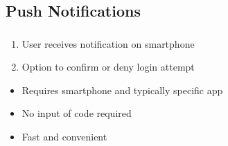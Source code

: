 \subsection{Push Notifications}
\begin{frame}
  \frametitle{\currentsectionname}
  \begin{enumerate}
    \item User receives notification on smartphone
    \item Option to confirm or deny login attempt
  \end{enumerate}
  \begin{itemize}
    \item Requires smartphone and typically specific app
    \item No input of code required
    \item Fast and convenient
  \end{itemize}

\end{frame}

